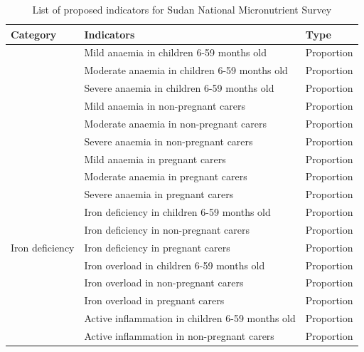 \documentclass[12pt,a4paper]{article}
\begin{document}
\begin{table}[H]

\caption{\label{tab:indicators}List of proposed indicators for Sudan National Micronutrient Survey}
\centering
\begin{tabular}[t]{lll}
\toprule
\textbf{Category} & \textbf{Indicators} & \textbf{Type}\\
\midrule
\rowcolor{gray!6}   & Mild anaemia in children 6-59 months old & Proportion\\
\cmidrule{2-3}
 & Moderate anaemia in children 6-59 months old & Proportion\\
\cmidrule{2-3}
\rowcolor{gray!6}   & Severe anaemia in children 6-59 months old & Proportion\\
\cmidrule{2-3}
 & Mild anaemia in non-pregnant carers & Proportion\\
\cmidrule{2-3}
\rowcolor{gray!6}   & Moderate anaemia in non-pregnant carers & Proportion\\
\cmidrule{2-3}
 & Severe anaemia in non-pregnant carers & Proportion\\
\cmidrule{2-3}
\rowcolor{gray!6}   & Mild anaemia in pregnant carers & Proportion\\
\cmidrule{2-3}
 & Moderate anaemia in pregnant carers & Proportion\\
\cmidrule{2-3}
\rowcolor{gray!6}  \multirow[t]{-9}{*}{\raggedright\arraybackslash Anaemia} & Severe anaemia in pregnant carers & Proportion\\
\cmidrule{1-3}
 & Iron deficiency in children 6-59 months old & Proportion\\
\cmidrule{2-3}
\rowcolor{gray!6}   & Iron deficiency in non-pregnant carers & Proportion\\
\cmidrule{2-3}
\multirow[t]{-3}{*}{\raggedright\arraybackslash Iron deficiency} & Iron deficiency in pregnant carers & Proportion\\
\cmidrule{1-3}
\rowcolor{gray!6}   & Iron overload in children 6-59 months old & Proportion\\
\cmidrule{2-3}
 & Iron overload in non-pregnant carers & Proportion\\
\cmidrule{2-3}
\rowcolor{gray!6}  \multirow[t]{-3}{*}{\raggedright\arraybackslash Iron overload} & Iron overload in pregnant carers & Proportion\\
\cmidrule{1-3}
 & Active inflammation in children 6-59 months old & Proportion\\
\cmidrule{2-3}
\rowcolor{gray!6}   & Active inflammation in non-pregnant carers & Proportion\\

\end{tabular}
\end{table}
\end{document}
